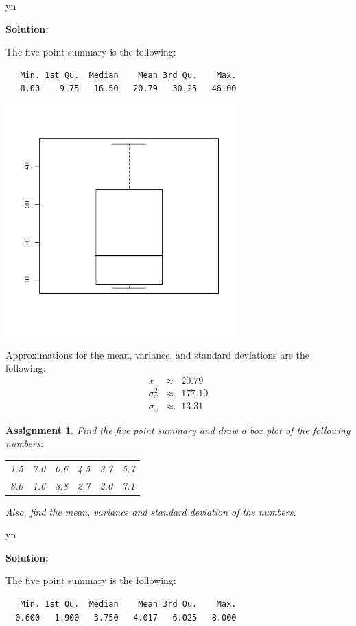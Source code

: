 \documentclass[12pt]{article}
\def\solutions{y}
\def\solutions{n}
\newtheorem{assignment}{Assignment}[section]
\begin{document}
\if y\solutions

\textbf{Solution:}

The five point summary is the following:
\begin{verbatim}
   Min. 1st Qu.  Median    Mean 3rd Qu.    Max. 
   8.00    9.75   16.50   20.79   30.25   46.00 
\end{verbatim}

\centerline{\includegraphics[width=3.5in]{prob35}}

Approximations for the mean, variance, and standard deviations are the
following:
\begin{eqnarray*}
  \bar{x}    & \approx & 20.79 \\
  \sigma^2_x & \approx & 177.10 \\
  \sigma_x   & \approx & 13.31
\end{eqnarray*}

\fi

\begin{assignment}
  Find the five point summary and draw a box plot of the following numbers:
  \begin{center}
    \begin{tabular}{rrrrrr}
       1.5 & 7.0 & 0.6 & 4.5 & 3.7 & 5.7 \\
       8.0 & 1.6 & 3.8 & 2.7 & 2.0 & 7.1
    \end{tabular}
  \end{center}
  Also, find the mean, variance and standard deviation of the numbers.
\end{assignment}

\if y\solutions

\textbf{Solution:}

The five point summary is the following:
\begin{verbatim}
   Min. 1st Qu.  Median    Mean 3rd Qu.    Max. 
  0.600   1.900   3.750   4.017   6.025   8.000 
\end{verbatim}
\end{document}

